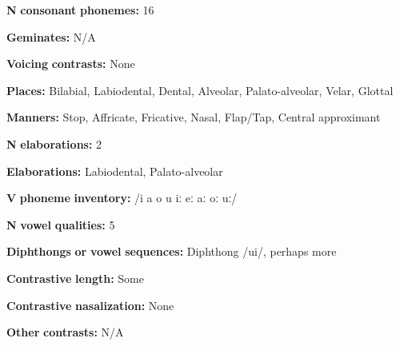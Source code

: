 \begin{styleBody}
\textbf{N} \textbf{consonant} \textbf{phonemes:} 16
\end{styleBody}

\begin{styleBody}
\textbf{Geminates:} N/A
\end{styleBody}

\begin{styleBody}
\textbf{Voicing} \textbf{contrasts:} None
\end{styleBody}

\begin{styleBody}
\textbf{Places:} Bilabial, Labiodental, Dental, Alveolar, Palato-alveolar, Velar, Glottal
\end{styleBody}

\begin{styleBody}
\textbf{Manners:} Stop, Affricate, Fricative, Nasal, Flap/Tap, Central approximant
\end{styleBody}

\begin{styleBody}
\textbf{N} \textbf{elaborations:} 2
\end{styleBody}

\begin{styleBody}
\textbf{Elaborations:} Labiodental, Palato-alveolar
\end{styleBody}

\begin{styleBody}
\textbf{V} \textbf{phoneme} \textbf{inventory:} /i a o u iː eː aː oː uː/
\end{styleBody}

\begin{styleBody}
\textbf{N} \textbf{vowel} \textbf{qualities:} 5
\end{styleBody}

\begin{styleBody}
\textbf{Diphthongs} \textbf{or} \textbf{vowel} \textbf{sequences:} Diphthong /ui/, perhaps more
\end{styleBody}

\begin{styleBody}
\textbf{Contrastive} \textbf{length:} Some
\end{styleBody}

\begin{styleBody}
\textbf{Contrastive} \textbf{nasalization:} None
\end{styleBody}

\begin{styleBody}
\textbf{Other} \textbf{contrasts:} N/A
\end{styleBody}

